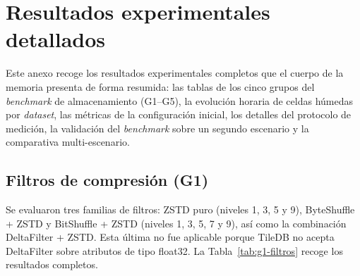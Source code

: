 \chapter{Resultados experimentales detallados}\label{anexo-b.-tablas-de-resultados-completas}

Este anexo recoge los resultados experimentales completos que el cuerpo de la memoria presenta de forma resumida: las tablas de los cinco grupos del \textit{benchmark} de almacenamiento (G1--G5), la evolución horaria de celdas húmedas por \textit{dataset}, las métricas de la configuración inicial, los detalles del protocolo de medición, la validación del \textit{benchmark} sobre un segundo escenario y la comparativa multi-escenario.

\section{Filtros de compresión (G1)}\label{g1.-filtros-de-compresion}

Se evaluaron tres familias de filtros: ZSTD puro (niveles 1, 3, 5 y 9), ByteShuffle + ZSTD y BitShuffle + ZSTD (niveles 1, 3, 5, 7 y 9), así como la combinación DeltaFilter + ZSTD. Esta última no fue aplicable porque TileDB no acepta DeltaFilter sobre atributos de tipo float32. La Tabla~\ref{tab:g1-filtros} recoge los resultados completos.


